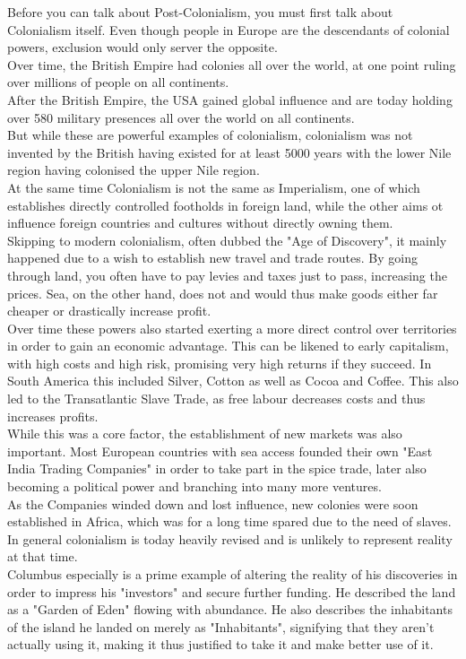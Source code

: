 \documentclass{article}
\begin{document}
	Before you can talk about Post-Colonialism, you must first talk about Colonialism itself. Even though people in Europe are the descendants of colonial powers, exclusion would only server the opposite. \\
	Over time, the British Empire had colonies all over the world, at one point ruling over millions of people on all continents. \\
	After the British Empire, the USA gained global influence and are today holding over 580 military presences all over the world on all continents. \\
	But while these are powerful examples of colonialism, colonialism was not invented by the British having existed for at least 5000 years with the lower Nile region having colonised the upper Nile region. \\
	At the same time Colonialism is not the same as Imperialism, one of which establishes directly controlled footholds in foreign land, while the other aims ot influence foreign countries and cultures without directly owning them. \\
	Skipping to modern colonialism, often dubbed the "Age of Discovery", it mainly happened due to a wish to establish new travel and trade routes. By going through land, you often have to pay levies and taxes just to pass, increasing the prices. Sea, on the other hand, does not and would thus make goods either far cheaper or drastically increase profit. \\
	Over time these powers also started exerting a more direct control over territories in order to gain an economic advantage. This can be likened to early capitalism, with high costs and high risk, promising very high returns if they succeed. In South America this included Silver, Cotton as well as Cocoa and Coffee. This also led to the Transatlantic Slave Trade, as free labour decreases costs and thus increases profits. \\
	While this was a core factor, the establishment of new markets was also important. Most European countries with sea access founded their own "East India Trading Companies" in order to take part in the spice trade, later also becoming a political power and branching into many more ventures. \\
	As the Companies winded down and lost influence, new colonies were soon established in Africa, which was for a long time spared due to the need of slaves. \\
	In general colonialism is today heavily revised and is unlikely to represent reality at that time. \\
	Columbus especially is a prime example of altering the reality of his discoveries in order to impress his "investors" and secure further funding. He described the land as a "Garden of Eden" flowing with abundance. He also describes the inhabitants of the island he landed on merely as "Inhabitants", signifying that they aren't actually using it, making it thus justified to take it and make better use of it. \\
\end{document}

